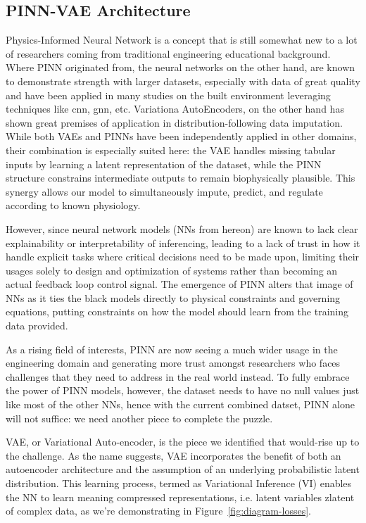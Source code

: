 \subsection{PINN-VAE Architecture}\label{sec:PINN_VAE_Arch}
Physics-Informed Neural Network is a concept that is still somewhat new to a lot of researchers coming from traditional engineering educational background. Where PINN originated from, the neural networks on the other hand, are known to demonstrate strength with larger datasets, especially with data of great quality and have been applied in many studies on the built environment leveraging techniques like \gls{cnn}, \gls{gnn}, etc. Variationa AutoEncoders, on the other hand has shown great premises of application in distribution-following data imputation. While both VAEs and PINNs have been independently applied in other domains, their combination is especially suited here: the VAE handles missing tabular inputs by learning a latent representation of the dataset, while the PINN structure constrains intermediate outputs to remain biophysically plausible. This synergy allows our model to simultaneously impute, predict, and regulate according to known physiology. %

However, since neural network models (NNs from hereon) are known to lack clear explainability or interpretability of inferencing, leading to a lack of trust in how it handle explicit tasks where critical decisions need to be made upon, limiting their usages solely to design and optimization of systems rather than becoming an actual feedback loop control signal. 
The emergence of PINN alters that image of NNs as it ties the black models directly to physical constraints and governing equations, putting constraints on how the model should learn from the training data provided. 

As a rising field of interests, PINN are now seeing a much wider usage in the engineering domain and generating more trust amongst researchers who faces challenges that they need to address in the real world instead. To fully embrace the power of PINN models, however, the dataset needs to have no null values just like most of the other NNs, hence with the current combined datset, PINN alone will not suffice: we need another piece to complete the puzzle.

VAE, or Variational Auto-encoder, is the piece we identified that would-rise up to the challenge. As the name suggests, VAE incorporates the benefit of both an autoencoder architecture and the assumption of an underlying probabilistic latent distribution. This learning process, termed as Variational Inference (VI) enables the NN to learn meaning compressed representations, i.e. latent variables \gls{zlatent} of complex data\cite{Kingma2013VAE,Kingma2019IntroVAE}, as we're demonstrating in Figure~\ref{fig:diagram-losses}. 


